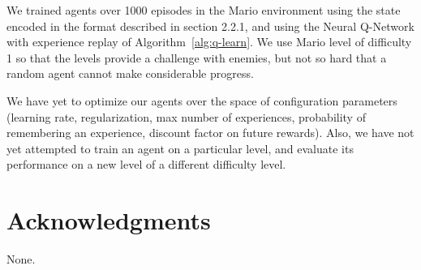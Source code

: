 \documentclass{article}
\begin{document}
We trained agents over 1000 episodes in the Mario environment using the state encoded in the format described in section 2.2.1, and using the Neural Q-Network with experience replay of Algorithm~\ref{alg:q-learn}. We use Mario level of difficulty 1 so that the levels provide a challenge with enemies, but not so hard that a random agent cannot make considerable progress.
 
 We have yet to optimize our agents over the space of configuration parameters (learning rate, regularization, max number of experiences, probability of remembering an experience, discount factor on future rewards). Also, we have not yet attempted to train an agent on a particular level, and evaluate its performance on a new level of a different difficulty level.
 
\section*{Acknowledgments} 
 
None.



\end{document}
